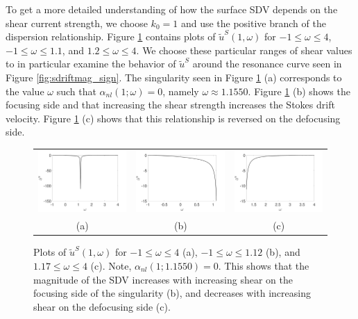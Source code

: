 \documentclass{JFM_Style/jfm}
\begin{document}
To get a more detailed understanding of how the surface SDV depends on the shear current strength, we choose $k_{0}=1$ and use the positive branch of the dispersion relationship.  Figure \ref{fig:stksdrfcomp} contains plots of $\tilde{u}^{S}(1,\omega)$ for $-1\leq \omega\leq 4$, $-1\leq \omega \leq 1.1$, and $1.2\le\omega\le4$.  We choose these particular ranges of shear values to in particular examine the behavior of $\tilde{u}^{S}$ around the resonance curve seen in Figure \ref{fig:sdriftmag_sign}.  The singularity seen in Figure \ref{fig:stksdrfcomp} (a) corresponds to the value $\omega$ such that $\alpha_{nl}(1;\omega)=0$, namely $\omega\approx1.1550$.  Figure \ref{fig:stksdrfcomp} (b) shows the focusing side and that increasing the shear strength increases the Stokes drift velocity.  Figure \ref{fig:stksdrfcomp} (c) shows that this relationship is reversed on the defocusing side.
\begin{figure}
\centering
\begin{tabular}{ccc}
\includegraphics[width=.32\textwidth]{us_wide_range} & \includegraphics[width=.32\textwidth]{us_n1_to_1pt1} & \includegraphics[width=.32\textwidth]{us_1pt2_to_4}\\
(a) & (b) & (c)
\end{tabular}
\caption{\small Plots of $\tilde{u}^{S}(1,\omega)$ for $-1\leq \omega \leq 4$ (a), $-1\leq \omega \leq 1.12$ (b), and $1.17\leq \omega \leq 4$ (c).  Note, $\alpha_{nl}(1;1.1550)=0$.  This shows that the magnitude of the SDV increases with increasing shear on the focusing side of the singularity (b), and decreases with increasing shear on the defocusing side (c).}
\label{fig:stksdrfcomp}
\end{figure}
\end{document}
